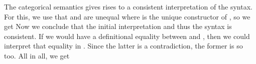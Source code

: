 
The categorical semantics gives rises to a consistent interpretation of the syntax.
For this, we use that   and   are unequal where  is the unique constructor of , so we get
Now we conclude that the initial interpretation and thus the syntax is consistent.
If we would have a definitional equality between  and , then we could interpret that equality in .
Since the latter is a contradiction, the former is so too.
All in all, we get

\begin{code}%
\>[0]\AgdaSpace{}%
\AgdaSymbol{:}\AgdaSpace{}%
\AgdaSpace{}%
\<%
\end{code}

